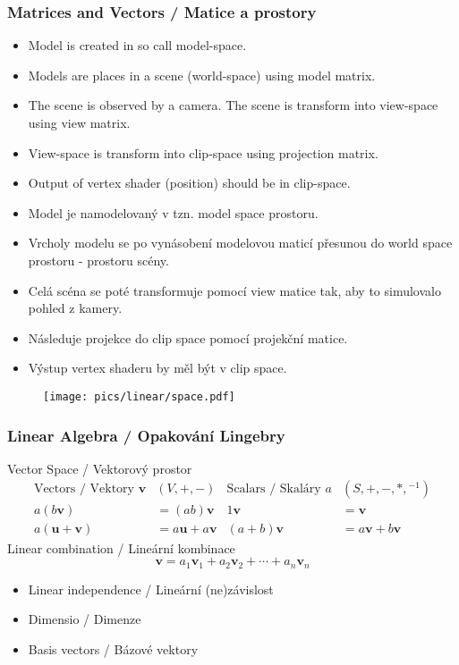 \newcommand{\V}[1]{\ensuremath{\mathbf{#1}}}
\newcommand{\NV}[1]{\ensuremath{\mathbf{\hat{#1}}}}

\begin{frame}\frametitle{Matrices and Vectors / Matice a prostory}\scriptsize
	\begin{itemize}
		\item Model is created in so call model-space.
    \item Models are places in a scene (world-space) using model matrix.
    \item The scene is observed by a camera. The scene is transform into view-space using view matrix.
    \item View-space is transform into clip-space using projection matrix.
    \item Output of vertex shader (position) should be in clip-space.
	\end{itemize}
	\begin{itemize}
		\item Model je namodelovaný v tzn. model space prostoru.
    \item Vrcholy modelu se po vynásobení modelovou maticí přesunou do world space prostoru - prostoru scény.
    \item Celá scéna se poté transformuje pomocí view matice tak, aby to simulovalo pohled z kamery.
    \item Následuje projekce do clip space pomocí projekční matice.
    \item Výstup vertex shaderu by měl být v clip space.
	\end{itemize}
  \begin{figure}[h]
    \texttt{[image: pics/linear/space.pdf]}
  \end{figure}
\end{frame}


\begin{frame}\frametitle{Linear Algebra / Opakování Lingebry}
  Vector Space / Vektorový prostor
  \pause
  \begin{align*}
    \text{Vectors / Vektory }\V{v}&(V,+,-) &
    \text{Scalars / Skaláry }a&(S,+,-,*,{}^{-1})\\
    a(b\V{v}) &= (ab)\V{v} & 1\V{v} &= \V{v} \\
    a(\V{u}+\V{v}) &= a\V{u} + a\V{v} & (a+b)\V{v} &= a\V{v} + b\V{v}
  \end{align*}
  \pause
  Linear combination / Lineární kombinace
  \pause
  \begin{equation*}
    \V{v} = a_1\V{v}_1 + a_2\V{v}_2 + \dotsb + a_n\V{v}_n
  \end{equation*}
  \pause
  \begin{itemize}
    \item Linear independence / Lineární (ne)závislost
    \item Dimensio / Dimenze
    \item Basis vectors / Bázové vektory
  \end{itemize}
\end{frame}

